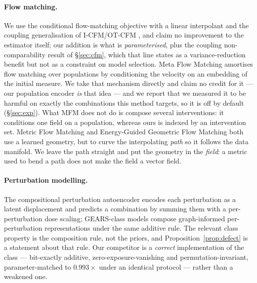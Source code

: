 \documentclass{article}
\begin{document}
\paragraph{Flow matching.} We use the conditional flow-matching objective
\citep{lipman2022fm} with a linear interpolant \citep{liu2022rectified} and the coupling
generalisation of I-CFM/OT-CFM \citep{tong2023otcfm}, and claim no improvement to the
estimator itself; our addition is what is \emph{parameterised}, plus the coupling
non-comparability result of \S\ref{sec:cfm}, which that line states as a variance-reduction
benefit but not as a constraint on model selection. Meta Flow Matching
\citep{atanackovic2024mfm} amortises flow matching over populations by conditioning the
velocity on an embedding of the initial measure. We take that mechanism directly and claim
no credit for it --- our population encoder \emph{is} that idea --- and we report that we
measured it to be harmful on exactly the combinations this method targets, so it is off by
default (\S\ref{sec:exp}). What MFM does not do is compose several interventions: it
conditions one field on a population, whereas ours is indexed by an intervention set.
Metric Flow Matching \citep{kapusniak2024metricfm} and Energy-Guided Geometric Flow Matching
\citep{zweig2025egfm} both use a learned geometry, but to curve the interpolating
\emph{path} so it follows the data manifold. We leave the path straight and put the geometry
in the \emph{field}: a metric used to bend a path does not make the field a vector field.

\paragraph{Perturbation modelling.} The compositional perturbation autoencoder
\citep{lotfollahi2023cpa} encodes each perturbation as a latent displacement and predicts a
combination by summing them with a per-perturbation dose scaling; GEARS-class models
\citep{roohani2023gears} compose graph-informed per-perturbation representations under the
same additive rule. The relevant class property is the composition rule, not the priors, and
Proposition~\ref{prop:defect} is a statement about that rule. Our competitor is a
\emph{correct} implementation of the class --- bit-exactly additive, zero-exposure-vanishing
and permutation-invariant, parameter-matched to $0.993\times$ under an identical protocol
--- rather than a weakened one.
\end{document}
